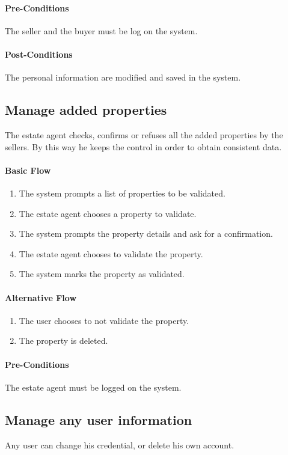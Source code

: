 \documentclass[a4paper,12pt]{article}
\begin{document}
\paragraph{Pre-Conditions}
The seller and the buyer must be log on the system.
\paragraph{Post-Conditions}
The personal information are modified and saved in the system.

\subsection{Manage added properties}
The estate agent checks, confirms or refuses all the added properties by the sellers. By this way he keeps the control in order to obtain consistent data.
\paragraph{Basic Flow}
\begin{enumerate}
\item The system prompts a list of properties to be validated.
\item The estate agent chooses a property to validate.
\item The system prompts the property details and ask for a confirmation.
\item The estate agent chooses to validate the property.
\item The system marks the property as validated.
\end{enumerate}
\paragraph{Alternative Flow}
\begin{enumerate}
\item The user chooses to not validate the property.
\item The property is deleted.
\end{enumerate}
\paragraph{Pre-Conditions}
The estate agent must be logged on the system.


\subsection{Manage any user information}
Any user can change his credential, or delete his own account.
\end{document}
